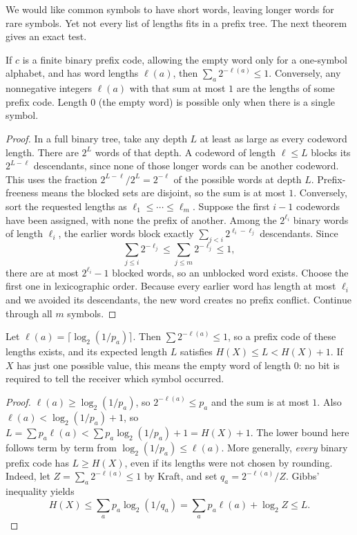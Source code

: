 We would like common symbols to have short words, leaving longer words for rare symbols. Yet not every list of lengths fits in a prefix tree. The next theorem gives an exact test.

\begin{theorem}[Kraft]\label{thm:kraft}
If $c$ is a finite binary prefix code, allowing the empty word only for a one-symbol alphabet, and has word lengths $\ell(a)$, then $\sum_a 2^{-\ell(a)}\le 1$. Conversely, any nonnegative integers $\ell(a)$ with that sum at most $1$ are the lengths of some prefix code. Length $0$ (the empty word) is possible only when there is a single symbol.
\end{theorem}
\begin{proof}
In a full binary tree, take any depth $L$ at least as large as every codeword length. There are $2^L$ words of that depth. A codeword of length $\ell\le L$ blocks its $2^{L-\ell}$ descendants, since none of those longer words can be another codeword. This uses the fraction $2^{L-\ell}/2^L=2^{-\ell}$ of the possible words at depth $L$. Prefix-freeness means the blocked sets are disjoint, so the sum is at most $1$. Conversely, sort the requested lengths as $\ell_1\le\cdots\le\ell_m$. Suppose the first $i-1$ codewords have been assigned, with none the prefix of another. Among the $2^{\ell_i}$ binary words of length $\ell_i$, the earlier words block exactly $\sum_{j<i}2^{\ell_i-\ell_j}$ descendants. Since
\[
\sum_{j\le i}2^{-\ell_j}\le\sum_{j\le m}2^{-\ell_j}\le1,
\]
there are at most $2^{\ell_i}-1$ blocked words, so an unblocked word exists. Choose the first one in lexicographic order. Because every earlier word has length at most $\ell_i$ and we avoided its descendants, the new word creates no prefix conflict. Continue through all $m$ symbols.
\end{proof}

\begin{theorem}\label{thm:shannon}
Let $\ell(a)=\lceil\log_2(1/p_a)\rceil$. Then $\sum 2^{-\ell(a)}\le 1$, so a prefix code of these lengths exists, and its expected length $L$ satisfies $H(X)\le L<H(X)+1$. If $X$ has just one possible value, this means the empty word of length $0$: no bit is required to tell the receiver which symbol occurred.
\end{theorem}
\begin{proof}
$\ell(a)\ge\log_2(1/p_a)$, so $2^{-\ell(a)}\le p_a$ and the sum is at most $1$. Also $\ell(a)<\log_2(1/p_a)+1$, so $L=\sum p_a\ell(a)<\sum p_a\log_2(1/p_a)+1=H(X)+1$. The lower bound here follows term by term from $\log_2(1/p_a)\le\ell(a)$. More generally, \emph{every} binary prefix code has $L\ge H(X)$, even if its lengths were not chosen by rounding. Indeed, let $Z=\sum_a2^{-\ell(a)}\le1$ by Kraft, and set $q_a=2^{-\ell(a)}/Z$. Gibbs' inequality yields
\[
 H(X)\le\sum_a p_a\log_2(1/q_a)
 =\sum_a p_a\ell(a)+\log_2 Z\le L.
\]
\end{proof}

